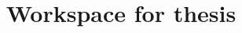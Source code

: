 \documentclass{lmcs}
\begin{document}
\title{Workspace for thesis}


\maketitle




\pagebreak



\end{document}
